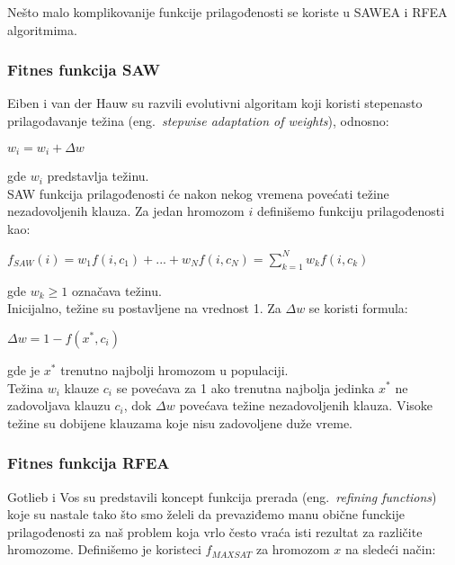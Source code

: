 \documentclass{article}
\begin{document}
Nešto malo komplikovanije funkcije prilagođenosti se koriste u SAWEA i RFEA algoritmima.

\subsubsection{Fitnes funkcija SAW}
\label{sec:fitness_saw}

Eiben i van der Hauw su razvili evolutivni algoritam koji koristi stepenasto prilagođavanje težina (eng.~{\em stepwise adaptation of weights}), odnosno:\\

	\begin{center}
	$ w_i = w_i + \Delta w $
	\end{center}
	
gde $ w_i $ predstavlja težinu. \\

SAW funkcija prilagođenosti će nakon nekog vremena povećati težine nezadovoljenih klauza. Za jedan hromozom $ i $ definišemo funkciju prilagođenosti kao:\\

	\begin{center}
	$ f_{SAW}(i) = w_1 f(i, c_1) + ... + w_N f(i, c_N) = \sum_{k=1}^{N} w_k f(i, c_k)	$
	\end{center}
	
gde $w_k \geq 1 $ označava težinu.\\

Inicijalno, težine su postavljene na vrednost 1. Za $ \Delta w $ se koristi formula: \\

	\begin{center}
	$ \Delta w = 1 - f(x^*, c_i) $
	\end{center}
	
gde  je $x^*$ trenutno najbolji hromozom u populaciji. \\

Težina $w_i$ klauze $c_i$ se povećava za 1 ako trenutna najbolja jedinka $x^*$ ne zadovoljava klauzu $c_i$, dok $\Delta w$ povećava težine nezadovoljenih klauza. Visoke težine su dobijene klauzama koje nisu zadovoljene duže vreme. 

\subsubsection{Fitnes funkcija RFEA}
\label{sec:fitness_rfea}
Gotlieb i Vos su predstavili koncept funkcija prerada (eng.~{\em refining functions}) koje su nastale tako što smo želeli da prevaziđemo manu obične funckije prilagođenosti za naš problem koja vrlo često vraća isti rezultat za različite hromozome. Definišemo je koristeci $ f_{MAXSAT} $ za hromozom $x$ na sledeći način:\\
\end{document}
